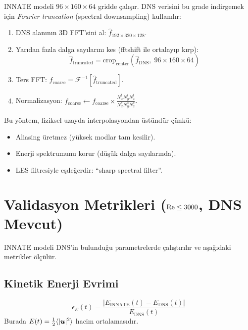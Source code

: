 INNATE modeli $96 \times 160 \times 64$ gridde çalışır. DNS verisini bu grade indirgemek için \textit{Fourier truncation} (spectral downsampling) kullanılır:

\begin{enumerate}
    \item DNS alanının 3D FFT'sini al: $\hat{f}_{192 \times 320 \times 128}$.
    \item Yarıdan fazla dalga sayılarını kes (fftshift ile ortalayıp kırp):
    \begin{equation}
        \hat{f}_{\text{truncated}} = \text{crop}_{\text{center}} \left( \hat{f}_{\text{DNS}}, \; 96 \times 160 \times 64 \right)
    \end{equation}
    \item Ters FFT: $f_{\text{coarse}} = \mathcal{F}^{-1}[\hat{f}_{\text{truncated}}]$.
    \item Normalizasyon: $f_{\text{coarse}} \leftarrow f_{\text{coarse}} \times \frac{N_x^t N_y^t N_z^t}{N_x^s N_y^s N_z^s}$.
\end{enumerate}

Bu yöntem, fiziksel uzayda interpolasyondan üstündür çünkü:
\begin{itemize}
    \item Aliasing üretmez (yüksek modlar tam kesilir).
    \item Enerji spektrumunu korur (düşük dalga sayılarında).
    \item LES filtresiyle eşdeğerdir: ``sharp spectral filter''.
\end{itemize}


\section{Validasyon Metrikleri ($\mathrm{Re} \leq 3000$, DNS Mevcut)}
\label{sec:val_metrics}

INNATE modeli DNS'in bulunduğu parametrelerde çalıştırılır ve aşağıdaki metrikler ölçülür.

\subsection{Kinetik Enerji Evrimi}

\begin{equation}
    \epsilon_E(t) = \frac{|E_{\text{INNATE}}(t) - E_{\text{DNS}}(t)|}{E_{\text{DNS}}(t)}
    \label{eq:energy_error}
\end{equation}
Burada $E(t) = \frac{1}{2} \langle |\bm{u}|^2 \rangle$ hacim ortalamasıdır.

